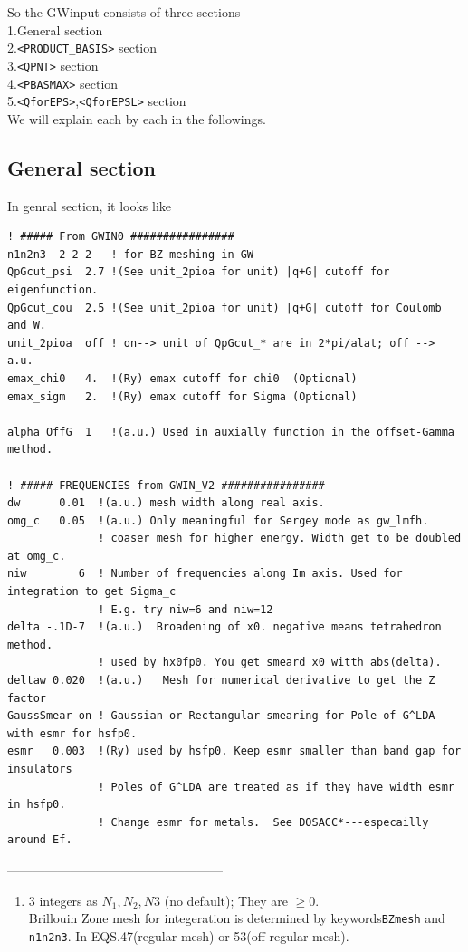 \documentclass[a4paper,10pt,epsf,fleqn]{article}
\newcommand{\fx}[1]{\subsection{\sf #1\index{\sf #1}}}
\newcommand{\keyw}[1]{\fbox{\tt #1}}
\begin{document}
{So the {\sf GWinput} consists of three sections \\
1.General section \\
2.\verb#<PRODUCT_BASIS># section\\
3.\verb#<QPNT># section\\
4.\verb#<PBASMAX># section\\
5.\verb#<QforEPS>#,\verb#<QforEPSL># section\\
We will explain each by each in the followings.

\newpage
\fx{General section}

In genral section, it looks like

\begin{verbatim}
! ##### From GWIN0 ################ 
n1n2n3  2 2 2   ! for BZ meshing in GW 
QpGcut_psi  2.7 !(See unit_2pioa for unit) |q+G| cutoff for eigenfunction.
QpGcut_cou  2.5 !(See unit_2pioa for unit) |q+G| cutoff for Coulomb and W.
unit_2pioa  off ! on--> unit of QpGcut_* are in 2*pi/alat; off --> a.u.
emax_chi0   4.  !(Ry) emax cutoff for chi0  (Optional)
emax_sigm   2.  !(Ry) emax cutoff for Sigma (Optional)

alpha_OffG  1   !(a.u.) Used in auxially function in the offset-Gamma method.

! ##### FREQUENCIES from GWIN_V2 ################ 
dw      0.01  !(a.u.) mesh width along real axis.
omg_c   0.05  !(a.u.) Only meaningful for Sergey mode as gw_lmfh.
              ! coaser mesh for higher energy. Width get to be doubled at omg_c.
niw        6  ! Number of frequencies along Im axis. Used for integration to get Sigma_c
              ! E.g. try niw=6 and niw=12
delta -.1D-7  !(a.u.)  Broadening of x0. negative means tetrahedron method.
              ! used by hx0fp0. You get smeard x0 witth abs(delta).
deltaw 0.020  !(a.u.)   Mesh for numerical derivative to get the Z factor
GaussSmear on ! Gaussian or Rectangular smearing for Pole of G^LDA with esmr for hsfp0.
esmr   0.003  !(Ry) used by hsfp0. Keep esmr smaller than band gap for insulators
              ! Poles of G^LDA are treated as if they have width esmr in hsfp0. 
              ! Change esmr for metals.  See DOSACC*---especailly around Ef.
\end{verbatim}

---------------------------------------------------\\
\begin{enumerate}
\item 
\keyw{n1n2n3} 3 integers as $N_1,N_2,N3$ (no default); They are $\ge 0$. \\
Brillouin Zone mesh for integeration
is determined by keywords{\tt BZmesh} and {\tt n1n2n3}. 
In EQS.47(regular mesh) or 53(off-regular mesh).\\


\end{enumerate}}
\end{document}
